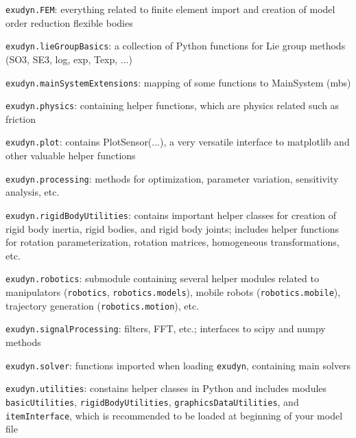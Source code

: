     \item[--] \texttt{exudyn.FEM}: everything related to finite element import and creation of model order reduction flexible bodies
    \item[--] \texttt{exudyn.lieGroupBasics}: a collection of Python functions for Lie group methods (SO3, SE3, log, exp, Texp, ...)
    \item[--] \texttt{exudyn.mainSystemExtensions}: mapping of some functions to MainSystem (mbs)
    \item[--] \texttt{exudyn.physics}: containing helper functions, which are physics related such as friction
    \item[--] \texttt{exudyn.plot}: contains PlotSensor(...), a very versatile interface to matplotlib and other valuable helper functions
    \item[--] \texttt{exudyn.processing}: methods for optimization, parameter variation, sensitivity analysis, etc.
    \item[--] \texttt{exudyn.rigidBodyUtilities}: contains important helper classes for creation of rigid body inertia, rigid bodies, and rigid body joints; includes helper functions for rotation parameterization, rotation matrices, homogeneous transformations, etc.
    \item[--] \texttt{exudyn.robotics}: submodule containing several helper modules related to manipulators (\texttt{robotics}, \texttt{robotics.models}), mobile robots (\texttt{robotics.mobile}), trajectory generation (\texttt{robotics.motion}), etc.
    \item[--] \texttt{exudyn.signalProcessing}: filters, FFT, etc.; interfaces to scipy and numpy methods
    \item[--] \texttt{exudyn.solver}: functions imported when loading \texttt{exudyn}, containing main solvers
    \item[--] \texttt{exudyn.utilities}: constains helper classes in Python and includes \codeName modules \texttt{basicUtilities}, \texttt{rigidBodyUtilities}, \texttt{graphicsDataUtilities}, and \texttt{itemInterface}, which is recommended to be loaded at beginning of your model file
  \ei
\ei
%
